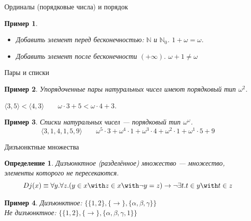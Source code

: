 \documentclass[aspectratio=169]{beamer}
\newtheorem{dfn}{Определение}[section]
\newtheorem{exm}{Пример}[section]
\begin{document}
\begin{frame}{Ординалы (порядковые числа) и порядок}
\begin{exm}\begin{itemize}
\item Добавить элемент перед бесконечностью: $\mathbb{N}$ и $\mathbb{N}_0$.
\pause
$1 + \omega = \omega$. \pause
\item Добавить элемент после бесконечности $(+\infty)$. \pause $\omega + 1 \ne \omega$ \pause
\end{itemize}\end{exm}
\end{frame}

\begin{frame}{Пары и списки}
\begin{exm}Упорядоченные пары натуральных чисел имеют порядковый тип $\omega^2$.\pause

\begin{center}$\langle 3,5 \rangle < \langle 4,3 \rangle\quad\quad\omega \cdot 3 + 5 < \omega \cdot 4 + 3$.\end{center}\end{exm}\pause

\begin{exm}Списки натуральных чисел --- порядковый тип $\omega^\omega$.
$$\langle 3,1,4,1,5,9\rangle\quad\quad \omega^5 \cdot 3 + \omega^4 \cdot 1 + \omega^3 \cdot 4 + \omega^2 \cdot 1 + \omega^1 \cdot 5 + 9$$\end{exm}
\end{frame}

\begin{frame}{Дизъюнктные множества}
\begin{dfn}Дизъюнктное (разделённое) множество --- множество, элементы которого
не пересекаются. 
$$Dj(x) \equiv \forall y.\forall z.(y \in x \with z \in x \with \neg y=z) \rightarrow 
\neg \exists t.t \in y \with t \in z$$
\end{dfn}\pause

\begin{exm}Дизъюнктное: $\{\{1,2\},\{\rightarrow\},\{\alpha,\beta,\gamma\}\}$\\ \pause
Не дизъюнктное: $\{\{1,2\},\{\rightarrow\},\{\alpha,\beta,\gamma,1\}\}$
\end{exm}
\end{frame}
\end{document}
